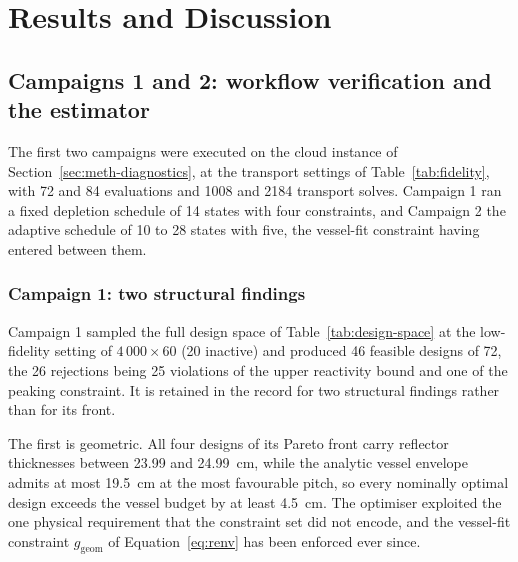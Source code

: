 \providecommand{\openpoint}[1]{\par\noindent\fbox{\parbox{0.97\linewidth}{%
  \textbf{Open point:} #1}}\par}

\chapter{Results and Discussion}
\label{ch:results}

\section{Campaigns 1 and 2: workflow verification and the estimator}
\label{sec:res-c1c2}

The first two campaigns were executed on the cloud instance of
Section~\ref{sec:meth-diagnostics}, at the transport settings of
Table~\ref{tab:fidelity}, with 72 and 84 evaluations and 1008 and 2184
transport solves. Campaign 1 ran a fixed depletion schedule of 14
states with four constraints, and Campaign 2 the adaptive schedule of
10 to 28 states with five, the vessel-fit constraint having entered
between them.

\subsection{Campaign 1: two structural findings}
\label{sec:res-c1}

Campaign 1 sampled the full design space of
Table~\ref{tab:design-space} at the low-fidelity setting of
$4\,000\times60$ (20 inactive) and produced 46
feasible designs of 72, the 26 rejections being 25 violations of the
upper reactivity bound and one of the peaking constraint. It is retained in
the record for two structural findings rather than for its front.

The first is geometric. All four designs of its Pareto front carry
reflector thicknesses between 23.99 and \SI{24.99}{cm}, while the
analytic vessel envelope admits at most \SI{19.5}{cm} at the most
favourable pitch, so every nominally optimal design exceeds the vessel
budget by at least \SI{4.5}{cm}. The optimiser exploited the one
physical requirement that the constraint set did not encode, and the
vessel-fit constraint $g_\mathrm{geom}$ of
Equation~\eqref{eq:renv} has been enforced ever since.

